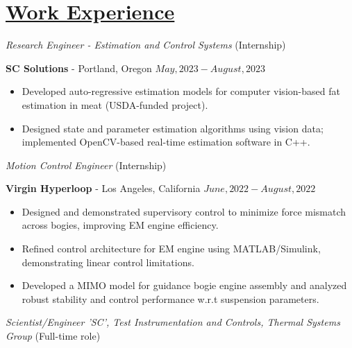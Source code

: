 \section*{\underline{Work Experience}}
\noindent\textit{Research Engineer  - Estimation and Control Systems} (Internship)

\textbf{SC Solutions} - Portland, Oregon \hfill $May, 2023 - August, 2023$

\begin{itemize}
    \item Developed auto-regressive estimation models for computer vision-based fat estimation in meat (USDA-funded project).
    \item Designed state and parameter estimation algorithms using vision data; implemented OpenCV-based real-time estimation software in C++.
\end{itemize}

\medskip

\noindent \textit{Motion Control Engineer } (Internship)

\textbf{Virgin Hyperloop} - Los Angeles, California \hfill $June, 2022  - August, 2022$

\begin{itemize}
        \item Designed and demonstrated supervisory control to minimize force mismatch across bogies, improving EM engine efficiency.
        \item Refined control architecture for EM engine using MATLAB/Simulink, demonstrating linear control limitations.
        \item Developed a MIMO model for guidance bogie engine assembly and analyzed robust stability and control performance w.r.t suspension parameters.
\end{itemize}

\medskip

\noindent\textit{Scientist/Engineer 'SC', Test Instrumentation and Controls, Thermal Systems Group} (Full-time role)

